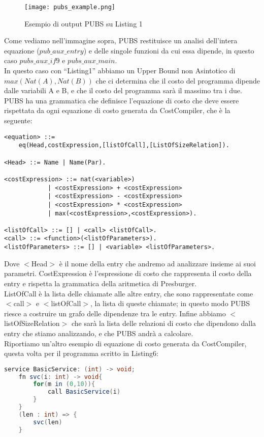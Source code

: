 \documentclass[../../main.tex]{subfiles}
\begin{document}
\begin{figure}[H]
    \centering
    \texttt{[image: pubs\_example.png]}
    \caption{Esempio di output PUBS su Listing 1}
\end{figure}
Come vediamo nell'immagine sopra, PUBS restituisce un analisi dell'intera equazione ($pub\_aux\_entry$) e delle singole funzioni da cui essa dipende, in questo caso $pubs\_aux\_if9$ e $pubs\_aux\_main$.\\
In questo caso con ``Listing1'' abbiamo un Upper Bound non Asintotico di $max(Nat(A), Nat(B))$ che ci determina che il costo del programma dipende dalle variabili A e B, e che il costo del programma sarà il massimo tra i due.\\
PUBS ha una grammatica che definisce l'equazione di costo che deve essere rispettata da ogni equazione di costo generata da CostCompiler, che è la seguente:
\newpage
\begin{lstlisting}[language=ANTLR, caption={Grammatica PUBS}]
<equation> ::= 
    eq(Head,costExpression,[listOfCall],[ListOfSizeRelation]).

<Head> ::= Name | Name(Par).

<costExpression> ::= nat(<variable>) 
            | <costExpression> + <costExpression> 
            | <costExpression> - <costExpression> 
            | <costExpression> * <costExpression> 
            | max(<costExpression>,<costExpression>).
                
<listOfCall> ::= [] | <call> <listOfCall>.
<call> ::= <function>(<listOfParameters>).
<listOfParameters> ::= [] | <variable> <listOfParameters>.
\end{lstlisting}
Dove $<$Head$>$ è il nome della entry che andremo ad analizzare insieme ai suoi parametri.
CostExpression è l'espressione di costo che rappresenta il costo della entry e rispetta la grammatica della aritmetica di Presburger.\\
ListOfCall è la lista delle chiamate alle altre entry, che sono rappresentate come $<$call$>$ e $<$listOfCall$>$, la lista di queste chiamate; in questo modo PUBS riesce a costruire un grafo delle dipendenze tra le entry.
Infine abbiamo $<$listOfSizeRelation$>$ che sarà la lista delle relazioni di costo che dipendono dalla entry che stiamo analizzando, e che PUBS andrà a calcolare.\\
Riportiamo un'altro esempio di equazione di costo generata da CostCompiler, questa volta per il programma scritto in Listing6:
\begin{lstlisting}[caption={Listing 6}, language=Java]
    service BasicService: (int) -> void;
    fn svc(i: int) -> void{
        for(m in (0,10)){
            call BasicService(i)
        }
    }
    (len : int) => {
        svc(len)
    }
\end{lstlisting}
\end{document}
